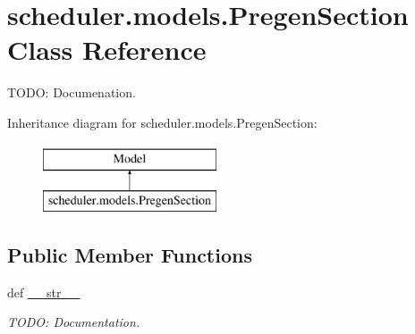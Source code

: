 \hypertarget{classscheduler_1_1models_1_1_pregen_section}{\section{scheduler.\-models.\-Pregen\-Section Class Reference}
\label{classscheduler_1_1models_1_1_pregen_section}
}


T\-O\-D\-O\-: Documenation.  


Inheritance diagram for scheduler.\-models.\-Pregen\-Section\-:\begin{figure}[H]
\begin{center}
\leavevmode
\includegraphics[height=2.000000cm]{classscheduler_1_1models_1_1_pregen_section}
\end{center}
\end{figure}
\subsection*{Public Member Functions}
\begin{DoxyCompactItemize}
\item 
\hypertarget{classscheduler_1_1models_1_1_pregen_section_a0f46c875c91c38646fdefea75fb5d652}{def \hyperlink{classscheduler_1_1models_1_1_pregen_section_a0f46c875c91c38646fdefea75fb5d652}{\-\_\-\-\_\-str\-\_\-\-\_\-}}\label{classscheduler_1_1models_1_1_pregen_section_a0f46c875c91c38646fdefea75fb5d652}

\begin{DoxyCompactList}\small\item\em T\-O\-D\-O\-: Documentation. \end{DoxyCompactList}\end{DoxyCompactItemize}
